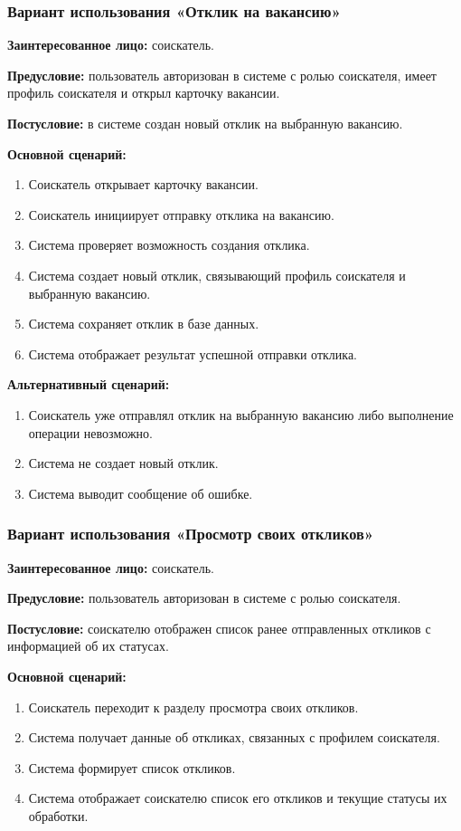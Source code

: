 \subsubsection{Вариант использования «Отклик на вакансию»}

\textbf{Заинтересованное лицо:} соискатель.

\textbf{Предусловие:} пользователь авторизован в системе с ролью соискателя, имеет профиль соискателя и открыл карточку вакансии.

\textbf{Постусловие:} в системе создан новый отклик на выбранную вакансию.

\textbf{Основной сценарий:}
\begin{enumerate}
	\item Соискатель открывает карточку вакансии.
	\item Соискатель инициирует отправку отклика на вакансию.
	\item Система проверяет возможность создания отклика.
	\item Система создает новый отклик, связывающий профиль соискателя и выбранную вакансию.
	\item Система сохраняет отклик в базе данных.
	\item Система отображает результат успешной отправки отклика.
\end{enumerate}

\textbf{Альтернативный сценарий:}
\begin{enumerate}
	\item Соискатель уже отправлял отклик на выбранную вакансию либо выполнение операции невозможно.
	\item Система не создает новый отклик.
	\item Система выводит сообщение об ошибке.
\end{enumerate}

\subsubsection{Вариант использования «Просмотр своих откликов»}

\textbf{Заинтересованное лицо:} соискатель.

\textbf{Предусловие:} пользователь авторизован в системе с ролью соискателя.

\textbf{Постусловие:} соискателю отображен список ранее отправленных откликов с информацией об их статусах.

\textbf{Основной сценарий:}
\begin{enumerate}
	\item Соискатель переходит к разделу просмотра своих откликов.
	\item Система получает данные об откликах, связанных с профилем соискателя.
	\item Система формирует список откликов.
	\item Система отображает соискателю список его откликов и текущие статусы их обработки.
\end{enumerate}

